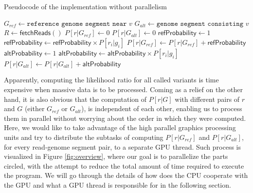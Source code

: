 \documentclass{PHlab-thesis}
\begin{document}
\begin{algorithm}
	\caption{Pseudocode of the implementation without parallelism}
	\label{alg:loop}
	\begin{algorithmic}
		\State $G_{ref} \gets \texttt{reference genome segment near } v$
		\State $G_{alt} \gets \texttt{genome segment consisting } v$
		\State $R \gets \mathsf{fetchReads}()$ 
			\State $P[r|G_{ref}] \gets 0$
			\State $P[r|G_{alt}] \gets 0$
				\State $\mathsf{refProbability} \gets 1$
					\State $\mathsf{refProbability} \gets \mathsf{refProbability} \times P[r_i|g_i]$
				\EndFor
				\State $P[r|G_{ref}] \gets P[r|G_{ref}] + \mathsf{refProbability}$
			\EndFor
				\State $\mathsf{altProbability} \gets 1$
					\State $\mathsf{altProbability} \gets \mathsf{altProbability} \times P[r_i|g_i]$
				\EndFor
				\State $P[r|G_{alt}] \gets P[r|G_{alt}] + \mathsf{altProbability}$
			\EndFor
		\EndFor
	\EndFor
	\end{algorithmic}
\end{algorithm}
Apparently, computing the likelihood ratio for all called variants is time expensive when massive data is to be processed. Coming as a relief on the other hand, it is also obvious that the computation of $P[r|G]$ with different pairs of $r$ and $G$ (either $G_{ref}$ or $G_{alt}$), is independent of each other, enabling us to process them in parallel without worrying about the order in which they were computed. Here, we would like to take advantage of the high parallel graphics processing units and try to distribute the subtasks of computing $P[r|G_{ref}]$ and $P[r|G_{alt}]$, for every read-genome segment pair, to a separate GPU thread. Such process is visualized in Figure \ref{fig:overview}, where our goal is to parallelize the parts circled, with the attempt to reduce the total amount of time required to execute the program. We will go through the details of how does the CPU cooperate with the GPU and what a GPU thread is responsible for in the following section.
\end{document}
